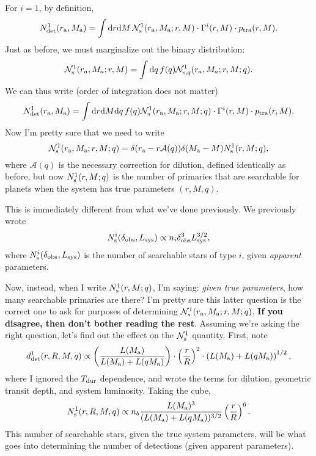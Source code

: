 \documentclass[12pt,modern]{aastex61}
\begin{document}
For $i=1$, by definition,
\begin{equation}
N_{\rm det}^1(r\a,M\a) =
\int \mathrm{d}r \mathrm{d}M \,
\mathcal{N}_{\rm s}^1(r\a,M\a; r,M)
\cdot\Gamma^i(r,M) \cdot p_{\rm tra}(r,M).
\end{equation}
Just as before, we must marginalize out the binary distribution:
\begin{equation}
\mathcal{N}_{\rm s}^1(r_a, M_a; r, M)
=\int \mathrm{d}q\,f(q)\mathcal{N}_{{\rm s}, q}^1(r_a, M_a; r, M; q).
\end{equation}
We can thus write (order of integration does not matter)
\begin{equation}
N_{\rm det}^1(r\a,M\a) =
\int \mathrm{d}r \mathrm{d}M \mathrm{d}q \,
f(q)
\mathcal{N}_{\rm s}^1(r\a,M\a; r,M; q)
\cdot\Gamma^i(r,M) \cdot p_{\rm tra}(r,M).
\label{eq:N_det_1}
\end{equation}
Now I'm pretty sure that we need to write
\begin{equation}
\mathcal{N}_{\rm s}^1(r\a,M\a; r,M; q)
=\delta(r\a-r\mathcal{A}(q))\delta(M\a-M) N\s^1(r,M;q),
\label{eq:less_simple}
\end{equation}
where $\mathcal{A}(q)$ is the necessary correction for dilution, defined 
identically as before, but now $N_{\rm s}^1(r,M;q)$ is the number of primaries that 
are searchable for planets when the system has true parameters $(r,M,q)$.

This is immediately different from what we've done previously.
We previously wrote
\begin{equation}
	N\s^i(\delta_{\rm obs}, L_{\rm sys}) \propto n_i \delta_{\rm obs}^3 L_{\rm 
		sys}^{3/2},
\end{equation}
where $N_{\rm s}^i(\delta_{\rm obs}, L_{\rm sys})$ is the number of searchable 
stars of type $i$, given {\it apparent} parameters.

Now, instead, when I write $N_{\rm s}^1(r,M;q)$, I'm saying: {\it given true 
parameters}, how many searchable primaries are there? I'm pretty sure this 
latter question is the correct one to ask for purposes of determining 
$\mathcal{N}_{\rm s}^1(r_{\rm a},M_{\rm a}; r,M; q)$.
{\bf If you disagree, then don't bother reading the rest}.
Assuming we're asking the right question, let's find out the effect on the 
$\mathcal{N}_{\rm s}^1$ quantity. First, note
\begin{equation}
d_{\rm det}^1(r,R,M,q) \propto
\left(\frac{L(M\a)}{L(M\a)+L(qM\a)}\right)
\cdot \left(\frac{r}{R}\right)^2
\cdot \left(L(M\a)+L(qM\a)\right)^{1/2},
\end{equation}
where I ignored the $T_{\rm dur}$ dependence, and wrote the terms for 
dilution, geometric transit depth, and system luminosity.
Taking the cube,
\begin{equation}
N\s^1(r,R,M,q) \propto
n_b
\frac{L(M\a)^3}{(L(M\a) + L(qM\a))^{3/2}}
\left(\frac{r}{R}\right)^6.
\label{eq:N_s_real_parameters}
\end{equation}
This number of searchable stars, given the true system parameters, will be 
what goes into determining the number of detections (given apparent 
parameters).
\end{document}
